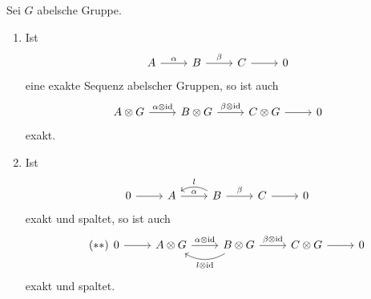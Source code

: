 \begin{bemerkung}
  Sei $G$ abelsche Gruppe.
  \begin{enumerate}
    \item
      Ist
      \begin{equation*}
        \begin{tikzcd}
          A \arrow{r}{\alpha}
          & B \arrow{r}{\beta}
          & C \arrow{r}{}
          & 0
        \end{tikzcd}
      \end{equation*}
      eine exakte Sequenz abelscher Gruppen, so ist auch
      \begin{equation*}
        \begin{tikzcd}
          A \tensor G \arrow{r}{\alpha \tensor \id}
          & B \tensor G \arrow{r}{\beta \tensor \id}
          & C \tensor G \arrow{r}{}
          & 0
        \end{tikzcd}
      \end{equation*}
      exakt.
    \item
      Ist
      \begin{equation*}
        \begin{tikzcd}
          0 \arrow{r}{}
          & A \arrow{r}{\alpha}
          & B \arrow{r}{\beta}
              \arrow[bend right,swap]{l}{l}
          & C \arrow{r}{}
          & 0
        \end{tikzcd}
      \end{equation*}
      exakt und spaltet, so ist auch
      \begin{equation*}
        \label{eqn:tensor_spaltung}
        \tag{$\ast\ast$}
        \begin{tikzcd}
          0 \arrow{r}{}
          & A \tensor G \arrow{r}{\alpha \tensor \id}
          & B \tensor G \arrow{r}{\beta \tensor \id}
                        \arrow[bend left]{l}{l \tensor \id}
          & C \tensor G \arrow{r}{}
          & 0
        \end{tikzcd}
      \end{equation*}
      exakt und spaltet.
  \end{enumerate}
\end{bemerkung}
